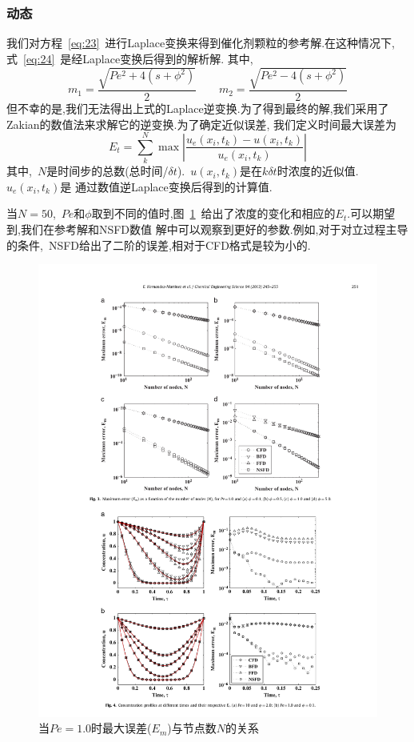\documentclass[a4paper,cs4size,adobefonts,cm-default,no-math]{ctexart}
\begin{document}
\subsubsection{动态}
我们对方程~\ref{eq:23}~进行Laplace变换来得到催化剂颗粒的参考解.在这种情况下,式~\ref{eq:24}~是经Laplace变换后得到的解析解.
其中,
\begin{equation*}
m_1=\dfrac{\sqrt{Pe^2+4(s+\phi^2)}}{2} \qquad m_2=\dfrac{\sqrt{Pe^2-4(s+\phi^2)}}{2}
\end{equation*}
但不幸的是,我们无法得出上式的Laplace逆变换.为了得到最终的解,我们采用了Zakian的数值法来求解它的逆变换.为了确定近似误差,
我们定义时间最大误差为
\begin{equation}
 E_t=\sum_k^N\max\left|\dfrac{u_e(x_i,t_k)-u(x_i,t_k)}{u_e(x_i,t_k)}\right|
\end{equation}
其中,~$N$是时间步的总数(总时间/$\delta t$).~$u(x_i,t_k)$是在$k\delta t$时浓度的近似值.~$u_e(x_i,t_k)$是
通过数值逆Laplace变换后得到的计算值.\par
当$N=50$,~$Pe$和$\phi$取到不同的值时,图~\ref{fig:4}~给出了浓度的变化和相应的$E_t$.可以期望到,我们在参考解和NSFD数值
解中可以观察到更好的参数.例如,对于对立过程主导的条件,~NSFD给出了二阶的误差,相对于CFD格式是较为小的.
\begin{figure}
\centering
\includegraphics[trim=80 45 80 420,clip]{./pic/f3.pdf}
\caption{当$Pe=1.0$时最大误差($E_m$)与节点数$N$的关系}\label{fig:4}
\end{figure}
\end{document}
